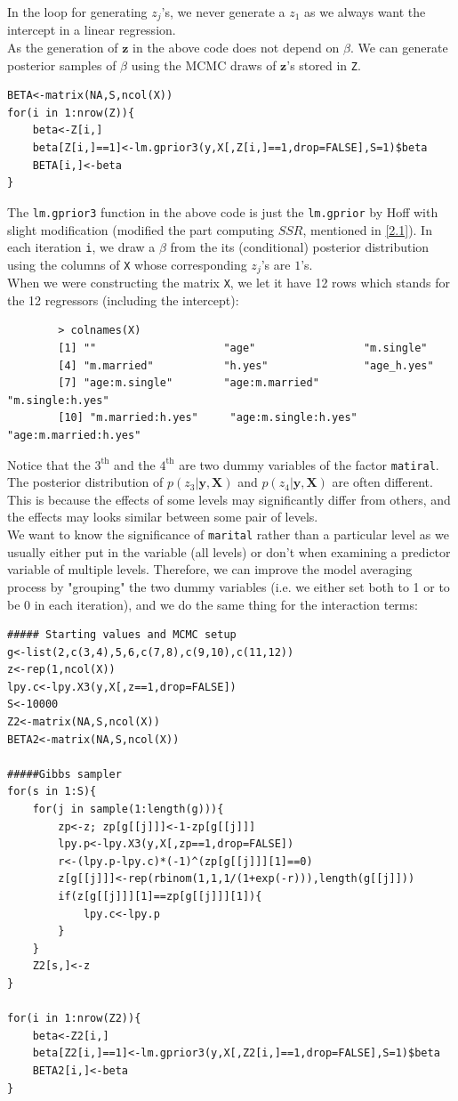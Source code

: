 \documentclass[a4page]{article}
\begin{document}
	In the loop for generating $z_j$'s, we never generate a $z_1$ as we always want the intercept in a linear regression.\\
	As the generation of $\bm{z}$ in the above code does not depend on $\beta$. We can generate posterior samples of $\beta$ using the MCMC draws of $\bm{z}$'s stored in \verb|Z|.
    \begin{verbatim}
BETA<-matrix(NA,S,ncol(X))
for(i in 1:nrow(Z)){
    beta<-Z[i,]
    beta[Z[i,]==1]<-lm.gprior3(y,X[,Z[i,]==1,drop=FALSE],S=1)$beta
    BETA[i,]<-beta
}
    \end{verbatim}
	The \verb|lm.gprior3| function in the above code is just the \verb|lm.gprior| by Hoff with slight modification (modified the part computing $SSR$, mentioned in \ref{2.1}). In each iteration \verb|i|, we draw a $\beta$ from the its (conditional) posterior distribution using the columns of \verb|X| whose corresponding $z_j$'s are $1$'s.\\
	When we were constructing the matrix \verb|X|, we let it have 12 rows which stands for the 12 regressors (including the intercept):
	\begin{verbatim}
		> colnames(X)
		[1] ""                    "age"                 "m.single"           
		[4] "m.married"           "h.yes"               "age_h.yes"          
		[7] "age:m.single"        "age:m.married"       "m.single:h.yes"     
		[10] "m.married:h.yes"     "age:m.single:h.yes"  "age:m.married:h.yes"
	\end{verbatim}
	Notice that the $3^{\text{th}}$ and the $4^{\text{th}}$ are two dummy variables of the factor \verb|matiral|. The posterior distribution of $p(z_3|\bm{y},\bm{X})$ and $p(z_4|\bm{y},\bm{X})$ are often different. This is because the effects of some levels may significantly differ from others, and the effects may looks similar between some pair of levels.\\
	We want to know the significance of \verb|marital| rather than a particular level as we usually either put in the variable (all levels) or don't when examining a predictor variable of multiple levels. Therefore, we can improve the model averaging process by "grouping" the two dummy variables (i.e. we either set both to 1 or to be 0 in each iteration), and we do the same thing for the interaction terms:
    	\begin{verbatim}
##### Starting values and MCMC setup
g<-list(2,c(3,4),5,6,c(7,8),c(9,10),c(11,12))
z<-rep(1,ncol(X))
lpy.c<-lpy.X3(y,X[,z==1,drop=FALSE])
S<-10000
Z2<-matrix(NA,S,ncol(X))
BETA2<-matrix(NA,S,ncol(X))

#####Gibbs sampler
for(s in 1:S){
    for(j in sample(1:length(g))){
        zp<-z; zp[g[[j]]]<-1-zp[g[[j]]]
        lpy.p<-lpy.X3(y,X[,zp==1,drop=FALSE])
        r<-(lpy.p-lpy.c)*(-1)^(zp[g[[j]]][1]==0)
        z[g[[j]]]<-rep(rbinom(1,1,1/(1+exp(-r))),length(g[[j]]))
        if(z[g[[j]]][1]==zp[g[[j]]][1]){
            lpy.c<-lpy.p
        }
    }
    Z2[s,]<-z
}

for(i in 1:nrow(Z2)){
    beta<-Z2[i,]
    beta[Z2[i,]==1]<-lm.gprior3(y,X[,Z2[i,]==1,drop=FALSE],S=1)$beta
    BETA2[i,]<-beta
}
    \end{verbatim}
    
\end{document}
